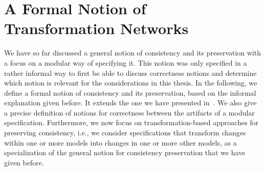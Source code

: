\section{A Formal Notion of Transformation Networks}
\label{chap:correctness:formalization}

We have so far discussed a general notion of consistency and its preservation with a focus on a modular way of specifying it.
This notion was only specified in a rather informal way to first be able to discuss correctness notions and determine which notion is relevant for the considerations in this thesis.
In the following, we define a formal notion of consistency and its preservation, based on the informal explanation given before.
It extends the one we have presented in~.
We also give a precise definition of notions for correctness between the artifacts of a modular specification.
Furthermore, we now focus on transformation-based approaches for preserving consistency, i.e., we consider specifications that transform changes within one or more models into changes in one or more other models, as a specialization of the general notion for consistency preservation that we have given before.

